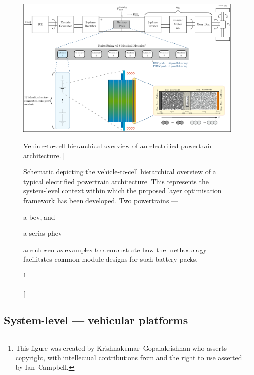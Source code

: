 \begin{figure}[!bp]
    \begin{minipage}[t]{\textwidth}
        \centering
        \includegraphics[width=\textwidth]{hierarchical_powertrain_to_cell_layer.pdf}
        \captionsetup{labelsep=note}
        \caption
        [%
        Vehicle-to-cell hierarchical overview of an electrified powertrain architecture.
        ]%
        {%
            Schematic depicting the vehicle-to-cell hierarchical overview of
            a typical electrified powertrain architecture. This represents the
            system-level context within which the proposed layer optimisation framework
            has been developed. Two  powertrains ---
            \begin{enumerate*}[label=\itshape\alph*\upshape)]
                \item a \gls{bev}, and
                \item a series \gls{phev}
            \end{enumerate*}
            are chosen as examples to demonstrate how the methodology facilitates
            common module designs for such battery packs.
        }%
        \label{fig:fig_PowertrainSchematic}
        \mpfootnotes[1]
        \footnote{This figure was created by \mbox{Krishnakumar Gopalakrishnan} who
            asserts copyright, with intellectual contributions from and the right to
        use asserted by \mbox{Ian Campbell}.}
    \end{minipage}
\end{figure}

\subsection{System-level --- vehicular platforms}

